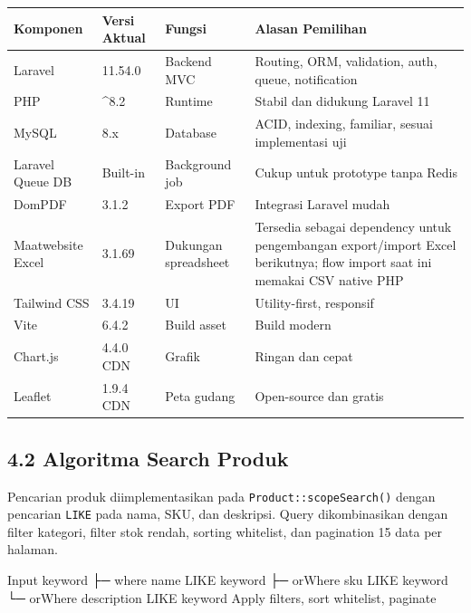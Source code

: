 \documentclass[
]{article}
\newenvironment{Shaded}{}{}
\newcommand{\NormalTok}[1]{#1}
\begin{document}
\begin{longtable}[]{@{}P{0.12\textwidth}C{0.08\textwidth}P{0.18\textwidth}P{0.56\textwidth}@{}}
\toprule\noalign{}
Komponen & Versi Aktual & Fungsi & Alasan Pemilihan \\
\midrule\noalign{}
\endhead
\bottomrule\noalign{}
\endlastfoot
Laravel & 11.54.0 & Backend MVC & Routing, ORM, validation, auth, queue,
notification \\
PHP & \^{}8.2 & Runtime & Stabil dan didukung Laravel 11 \\
MySQL & 8.x & Database & ACID, indexing, familiar, sesuai implementasi
uji \\
Laravel Queue DB & Built-in & Background job & Cukup untuk prototype
tanpa Redis \\
DomPDF & 3.1.2 & Export PDF & Integrasi Laravel mudah \\
Maatwebsite Excel & 3.1.69 & Dukungan spreadsheet & Tersedia sebagai
dependency untuk pengembangan export/import Excel berikutnya; flow
import saat ini memakai CSV native PHP \\
Tailwind CSS & 3.4.19 & UI & Utility-first, responsif \\
Vite & 6.4.2 & Build asset & Build modern \\
Chart.js & 4.4.0 CDN & Grafik & Ringan dan cepat \\
Leaflet & 1.9.4 CDN & Peta gudang & Open-source dan gratis \\
\end{longtable}

\subsection{4.2 Algoritma Search
Produk}\label{42-algoritma-search-produk}

Pencarian produk diimplementasikan pada \texttt{Product::scopeSearch()}
dengan pencarian \texttt{LIKE} pada nama, SKU, dan deskripsi. Query
dikombinasikan dengan filter kategori, filter stok rendah, sorting
whitelist, dan pagination 15 data per halaman.

\begin{Shaded}
\begin{Highlighting}[]
\NormalTok{Input keyword}
\NormalTok{  ├─ where name LIKE keyword}
\NormalTok{  ├─ orWhere sku LIKE keyword}
\NormalTok{  └─ orWhere description LIKE keyword}
\NormalTok{Apply filters, sort whitelist, paginate}
\end{Highlighting}
\end{Shaded}
\end{document}
